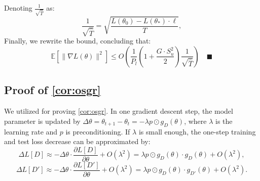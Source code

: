 \documentclass{article}
\theoremstyle{plain}
\theoremstyle{definition}
\theoremstyle{remark}
\begin{document}
\noindent
Denoting $\frac{1}{\sqrt{\hat{T}}}$ as:
\begin{equation}
    \frac{1}{\sqrt{\hat{T}}} = \sqrt{\frac{L(\theta_0) - L(\theta_*) \cdot \ell}{T}},
\end{equation}
Finally, we rewrite the bound, concluding that:
\begin{equation}
    \mathbb{E}[\|\nabla L(\theta)\|^2]
    \leq O\left(\frac{1}{P_l} \left(1 + \frac{G \cdot S_u^2}{2}\right) \frac{1}{\sqrt{\hat{T}}}\right) \quad\blacksquare
\end{equation}




\subsection{Proof of \cref{cor:osgr}} We utilized \cite{gsnr} for proving \cref{cor:osgr}. 
In one gradient descent step, the model parameter is updated by 
\(\Delta \theta = \theta_{t+1} - \theta_t = -\lambda p \odot g_D(\theta)\), 
where \(\lambda\) is the learning rate and $p$ is preconditioning. If \(\lambda\) is small enough, the one-step training and test loss decrease can be approximated by:
\begin{equation}
    \Delta L[D] \approx -\Delta \theta \cdot \frac{\partial L[D]}{\partial \theta} + O(\lambda^2) 
    = \lambda p \odot g_D(\theta) \cdot g_D(\theta) + O(\lambda^2),
\end{equation}
\begin{equation}
    \Delta L[D'] \approx -\Delta \theta \cdot \frac{\partial L[D']}{\partial \theta} + O(\lambda^2) 
    = \lambda p \odot g_D(\theta) \cdot g_{D'}(\theta) + O(\lambda^2).
\end{equation}
\end{document}
